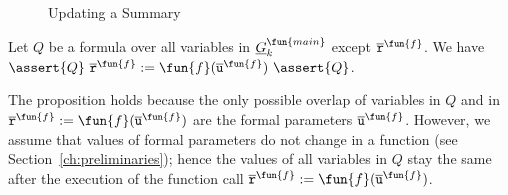 \begin{figure}[t]
  \centering

  \caption{Updating a Summary}
  \label{figure:updating-summary}
\end{figure}
\begin{proposition}
\label{propposition:invariant}
Let $Q$ be a formula over all variables in $\underline{G}^{\fun{main}}_k$ except $\overline{\mathtt{r}}^\fun{f}$.
We have $\assert{Q}\
  \overline{\mathtt{r}}^\fun{f} := \fun{f}
  (\overline{\mathtt{u}}^\fun{f})\ \assert{Q}$.
\end{proposition}
The proposition holds because the only possible overlap of variables in $Q$ and
in $\overline{\mathtt{r}}^\fun{f} := \fun{f} (\overline{\mathtt{u}}^\fun{f})$
are the formal parameters $\overline{\mathtt{u}}^\fun{f}$.
However, we assume that values of formal parameters do not change in a function
(see Section~\ref{ch:preliminaries});
hence the values of all variables in $Q$ stay the same after the execution of
the function call $\overline{\mathtt{r}}^\fun{f} := \fun{f} (\overline{\mathtt{u}}^\fun{f})$.

